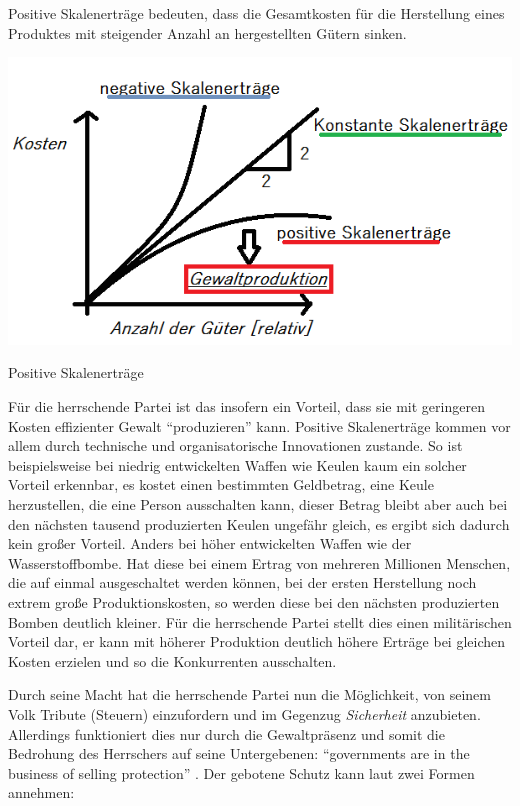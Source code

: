 Positive Skalenerträge bedeuten, dass die Gesamtkosten für die Herstellung eines Produktes mit steigender  Anzahl an hergestellten Gütern sinken.

\begin{dsafigure}
	\begin{center}
	\includegraphics[width=1\columnwidth]{img/Skalenertraege.png}
	\caption{Positive Skalenerträge}
	\label{fig:skalenertraege}
	\end{center}
\end{dsafigure}

Für die herrschende Partei ist das insofern ein Vorteil, dass sie mit geringeren Kosten effizienter Gewalt ``produzieren'' kann.
Positive Skalenerträge kommen vor allem durch technische und organisatorische Innovationen zustande.
So ist beispielsweise bei niedrig entwickelten Waffen wie Keulen kaum ein solcher Vorteil erkennbar, es kostet einen bestimmten Geldbetrag, eine Keule herzustellen, die  eine Person ausschalten kann, dieser Betrag bleibt aber auch bei den nächsten tausend produzierten Keulen ungefähr gleich, es ergibt sich dadurch kein großer Vorteil.
Anders bei höher entwickelten Waffen wie der Wasserstoffbombe.
Hat diese bei einem Ertrag von mehreren Millionen Menschen, die auf einmal ausgeschaltet werden können, bei der ersten Herstellung noch extrem große Produktionskosten, so werden diese bei den nächsten produzierten Bomben deutlich kleiner.
Für die herrschende Partei stellt dies einen militärischen Vorteil dar, er kann mit höherer Produktion deutlich höhere Erträge bei gleichen Kosten erzielen und so die Konkurrenten ausschalten.

Durch seine Macht hat die herrschende Partei nun die Möglichkeit, von seinem Volk  Tribute (Steuern) einzufordern und im Gegenzug \emph{Sicherheit} anzubieten.
Allerdings funktioniert dies nur durch die Gewaltpräsenz und somit die Bedrohung des Herrschers auf seine Untergebenen: ``governments are in the business of selling protection'' \parencite[175]{Tilly-1985-aa}.
Der gebotene Schutz kann laut \citeauthor{Tilly-1985-aa} zwei Formen annehmen:

